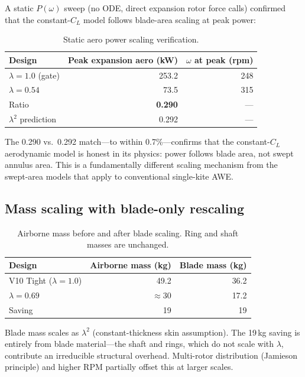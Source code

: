 \documentclass[11pt,a4paper]{article}
\begin{document}
A static $P(\omega)$ sweep (no ODE, direct expansion rotor force calls) confirmed that the constant-$C_L$ model follows blade-area scaling at peak power:

\begin{table}[htbp]
\centering
\caption{Static aero power scaling verification.}
\label{tab:static}
\begin{tabular}{@{}lrr@{}}
\toprule
Design & Peak expansion aero (kW) & $\omega$ at peak (rpm) \\
\midrule
$\lambda = 1.0$ (gate) & 253.2 & 248 \\
$\lambda = 0.54$       & 73.5  & 315 \\
\midrule
Ratio & \textbf{0.290} & --- \\
$\lambda^2$ prediction  & 0.292 & --- \\
\bottomrule
\end{tabular}
\end{table}

The 0.290 vs.\ 0.292 match---to within 0.7\%---confirms that the constant-$C_L$ aerodynamic model is honest in its physics: power follows blade area, not swept annulus area.
This is a fundamentally different scaling mechanism from the swept-area models that apply to conventional single-kite AWE.

\subsection{Mass scaling with blade-only rescaling}

\begin{table}[htbp]
\centering
\caption{Airborne mass before and after blade scaling. Ring and shaft masses are unchanged.}
\label{tab:mass}
\begin{tabular}{@{}lrr@{}}
\toprule
Design & Airborne mass (kg) & Blade mass (kg) \\
\midrule
V10 Tight ($\lambda = 1.0$) & 49.2 & 36.2 \\
$\lambda = 0.69$             & $\approx$30  & 17.2 \\
\midrule
Saving & 19 & 19 \\
\bottomrule
\end{tabular}
\end{table}

Blade mass scales as $\lambda^2$ (constant-thickness skin assumption).
The 19\,kg saving is entirely from blade material---the shaft and rings, which do not scale with $\lambda$, contribute an irreducible structural overhead.
Multi-rotor distribution (Jamieson principle) and higher RPM partially offset this at larger scales.
\end{document}
